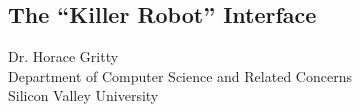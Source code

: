 \begin{center}
\section*{The ``Killer Robot'' Interface}
Dr. Horace Gritty\\
Department of Computer Science and Related Concerns\\
Silicon Valley University
\end{center}

